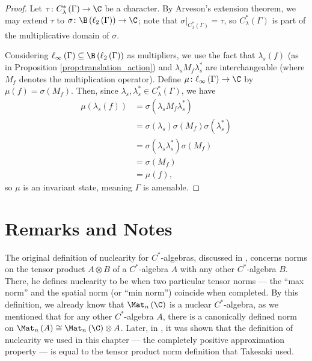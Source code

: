 \begin{proof}
  Let $\tau\colon C^{\ast}_{\lambda}\left( \Gamma \right)\rightarrow \C$ be a character. By Arveson's extension theorem, we may extend $\tau$ to $\sigma\colon \B\left( \ell_2\left( \Gamma \right) \right)\rightarrow \C$; note that $\sigma\bigr\vert_{C^{\ast}_{\lambda}\left( \Gamma \right)} = \tau$, so $C^{\ast}_{\lambda}\left( \Gamma \right)$ is part of the multiplicative domain of $\sigma$.\newline

  Considering $\ell_{\infty}\left( \Gamma \right)\subseteq \B\left( \ell_2\left( \Gamma \right) \right)$ as multipliers, we use the fact that $\lambda_s(f) $ (as in Proposition \ref{prop:translation_action}) and $\lambda_sM_f\lambda_s^{\ast}$ are interchangeable (where $M_f$ denotes the multiplication operator). Define $\mu\colon \ell_{\infty}\left( \Gamma \right)\rightarrow \C$ by $\mu(f) = \sigma\left( M_f \right)$. Then, since $\lambda_s,\lambda_s^{\ast}\in C^{\ast}_{\lambda}\left( \Gamma \right)$, we have
  \begin{align*}
    \mu\left( \lambda_s(f) \right) &= \sigma\left( \lambda_sM_f\lambda_s^{\ast} \right)\\
                                   &= \sigma\left( \lambda_s \right)\sigma\left( M_f \right)\sigma\left( \lambda_s^{\ast} \right)\\
                                   &= \sigma\left( \lambda_s\lambda_s^{\ast} \right)\sigma\left( M_f \right)\\
                                   &= \sigma\left( M_f \right)\\
                                   &= \mu\left( f \right),
  \end{align*}
  so $\mu$ is an invariant state, meaning $\Gamma$ is amenable.
\end{proof}

\section{Remarks and Notes}%
The original definition of nuclearity for $C^{\ast}$-algebras, discussed in \cite{cross_norm_takesaki}, concerns norms on the tensor product $A\otimes B$ of a $C^{\ast}$-algebra $A$ with any other $C^{\ast}$-algebra $B$. There, he defines nuclearity to be when two particular tensor norms --- the ``max norm'' and the spatial norm (or ``min norm'') coincide when completed. By this definition, we already know that $\Mat_n\left( \C \right)$ is a nuclear $C^{\ast}$-algebra, as we mentioned that for any other $C^{\ast}$-algebra $A$, there is a canonically defined norm on $\Mat_n\left( A \right)\cong \Mat_n\left( \C \right)\otimes A$. Later, in \cite{choi_nuclearity}, it was shown that the definition of nuclearity we used in this chapter --- the completely positive approximation property --- is equal to the tensor product norm definition that Takesaki used.
